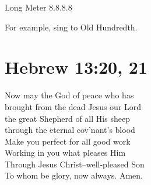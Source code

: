 \documentclass{article}
\begin{document}
\noindent Long Meter 8.8.8.8

\noindent For example, sing to Old Hundredth.

\section*{Hebrew 13:20, 21}

 Now may the God of peace who has\\
brought from the dead Jesus our Lord\\
the great Shepherd of all His sheep\\
through the eternal cov'nant's blood\\

 Make you perfect for all good work\\
Working in you what pleases Him\\
Through Jesus Christ--well-pleased Son\\
To whom be glory, now always. Amen.
\end{document}
